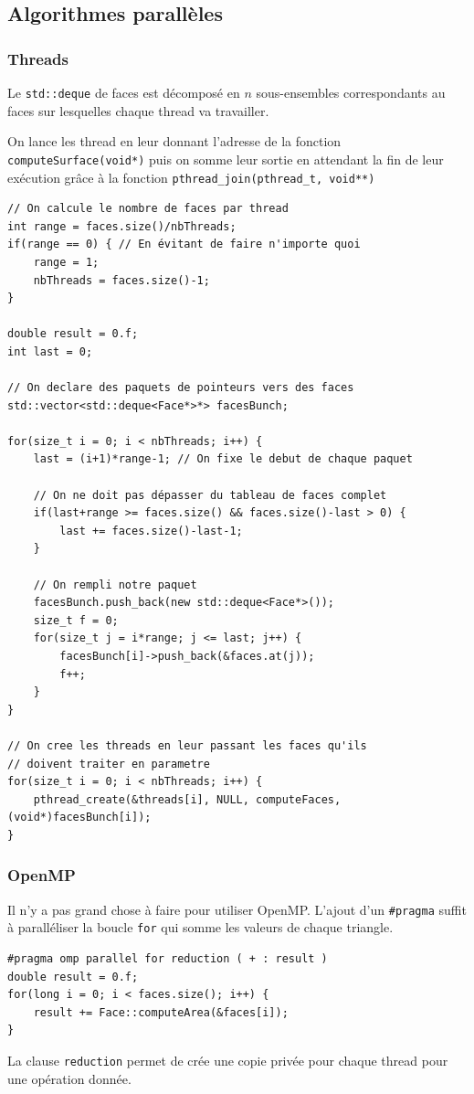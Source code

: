 \documentclass[a4paper]{article}
\begin{document}
	\subsection{Algorithmes parallèles}
		\subsubsection{Threads}
		Le \texttt{std::deque} de faces est décomposé en $n$ sous-ensembles correspondants au faces sur lesquelles chaque thread va travailler.

		On lance les thread en leur donnant l'adresse de la fonction \texttt{computeSurface(void*)} puis on somme leur sortie en attendant la fin de leur exécution grâce à la fonction \texttt{pthread\_join(pthread\_t, void**)}
		\begin{lstlisting}
// On calcule le nombre de faces par thread
int range = faces.size()/nbThreads;
if(range == 0) { // En évitant de faire n'importe quoi
	range = 1;
	nbThreads = faces.size()-1;
}

double result = 0.f;
int last = 0;

// On declare des paquets de pointeurs vers des faces
std::vector<std::deque<Face*>*> facesBunch;

for(size_t i = 0; i < nbThreads; i++) {
    last = (i+1)*range-1; // On fixe le debut de chaque paquet

	// On ne doit pas dépasser du tableau de faces complet
    if(last+range >= faces.size() && faces.size()-last > 0) {
        last += faces.size()-last-1;
    }

	// On rempli notre paquet
    facesBunch.push_back(new std::deque<Face*>());
    size_t f = 0;
    for(size_t j = i*range; j <= last; j++) {
        facesBunch[i]->push_back(&faces.at(j));
        f++;
    }
}

// On cree les threads en leur passant les faces qu'ils
// doivent traiter en parametre
for(size_t i = 0; i < nbThreads; i++) {
    pthread_create(&threads[i], NULL, computeFaces, (void*)facesBunch[i]);
}
		\end{lstlisting}

		\subsubsection{OpenMP}
		Il n'y a pas grand chose à faire pour utiliser OpenMP. L'ajout d'un \texttt{\#pragma} suffit à paralléliser la boucle \texttt{for} qui somme les valeurs de chaque triangle.
		\begin{lstlisting}
#pragma omp parallel for reduction ( + : result )
double result = 0.f;
for(long i = 0; i < faces.size(); i++) {
    result += Face::computeArea(&faces[i]);
}
		\end{lstlisting}
		La clause \texttt{reduction} permet de crée une copie privée pour chaque thread pour une opération donnée.
\end{document}
